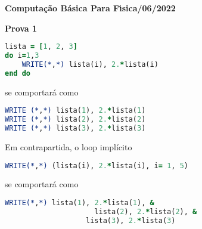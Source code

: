 \documentclass[12pt]{article}
\begin{document}
\begin{center}
\textbf{Computa\c{c}\~{a}o B\'{a}sica Para F\'{\i}sica/06/2022}

\textbf{Prova 1}
\end{center}

\begin{lstlisting}[language=Fortran]
lista = [1, 2, 3]
do i=1,3
	WRITE(*,*) lista(i), 2.*lista(i)
end do
\end{lstlisting}
se comportará como
\begin{lstlisting}[language=Fortran]
WRITE (*,*) lista(1), 2.*lista(1)
WRITE (*,*) lista(2), 2.*lista(2)
WRITE (*,*) lista(3), 2.*lista(3)
\end{lstlisting}
Em contrapartida, o loop implícito
\begin{lstlisting}[language=Fortran]
WRITE(*,*) (lista(i), 2.*lista(i), i= 1, 5)
\end{lstlisting}
se comportará como
\begin{lstlisting}[language=Fortran]
WRITE(*,*) lista(1), 2.*lista(1), &
					 lista(2), 2.*lista(2), &
				   lista(3), 2.*lista(3) 
\end{lstlisting}
\end{document}
